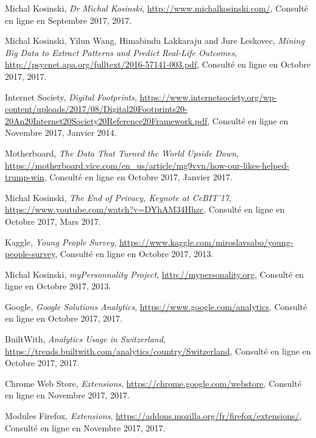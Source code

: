 \begin{thebibliography}{9}

  Michal Kosinski,
  \emph{Dr Michal Kosinski},
  \url{http://www.michalkosinski.com/},
  Consulté en ligne en Septembre 2017,
  2017.

  Michal Kosinski, Yilun Wang, Himabindu Lakkaraju and Jure Leskovec,
  \emph{Mining Big Data to Extract Patterns and Predict Real-Life Outcomes},
  \url{http://psycnet.apa.org/fulltext/2016-57141-003.pdf},
  Consulté en ligne en Octobre 2017,
  2017.

  Internet Society,
  \emph{Digital Footprints},
  \url{https://www.internetsociety.org/wp-content/uploads/2017/08/Digital20Footprints20-20An20Internet20Society20Reference20Framework.pdf},
  Consulté en ligne en Novembre 2017,
  Janvier 2014.

  Motherboard,
  \emph{The Data That Turned the World Upside Down},
  \url{https://motherboard.vice.com/en_us/article/mg9vvn/how-our-likes-helped-trump-win},
  Consulté en ligne en Octobre 2017,
  Janvier 2017.

  Michal Kosinski,
  \emph{The End of Privacy, Keynote at CeBIT'17},
  \url{https://www.youtube.com/watch?v=DYhAM34Hhzc},
  Consulté en ligne en Octobre 2017,
  Mars 2017.

  Kaggle,
  \emph{Young People Survey},
  \url{https://www.kaggle.com/miroslavsabo/young-people-survey},
  Consulté en ligne en Octobre 2017,
  2013.

  Michal Kosinski,
  \emph{myPersonnality Project},
  \url{http://mypersonality.org},
  Consulté en ligne en Octobre 2017,
  2013.

  Google,
  \emph{Google Solutions Analytics},
  \url{https://www.google.com/analytics},
  Consulté en ligne en Octobre 2017,
  2017.

  BuiltWith,
  \emph{Analytics Usage in Switzerland},
  \url{https://trends.builtwith.com/analytics/country/Switzerland},
  Consulté en ligne en Octobre 2017,
  2017.

  Chrome Web Store,
  \emph{Extensions},
  \url{https://chrome.google.com/webstore},
  Consulté en ligne en Novembre 2017,
  2017.

  Modules Firefox,
  \emph{Extensions},
  \url{https://addons.mozilla.org/fr/firefox/extensions/},
  Consulté en ligne en Novembre 2017,
  2017.


\end{thebibliography}
